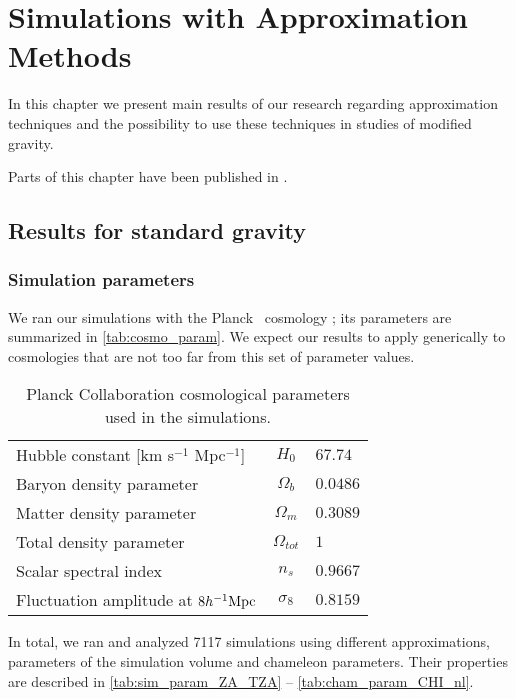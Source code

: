 \chapter{Simulations with Approximation Methods}
\label{chpt:app_sims}
In this chapter we present main results of our research regarding approximation techniques and the possibility to use these techniques in studies of modified gravity.

Parts of this chapter have been published in \textcite{2020MNRAS.493.2085V}.
\section{Results for standard gravity}

\subsection{Simulation parameters}
We ran our simulations with the Planck \LCDM\ cosmology \parencite{planck_cosm}; its parameters are summarized in \autoref{tab:cosmo_param}. We expect our results to apply generically to cosmologies that are not too far from this set of parameter values.
\begin{table}
\begin{tabular}{ l c l }
  \hline \hline
  Hubble constant  [km s$^{-1}$ Mpc$^{-1}$] & $H_0$ & $67.74$ \\
  Baryon density parameter & $\Omega_b$ & $0.0486$ \\
  Matter density parameter & $\Omega_m$ & $0.3089$ \\
  Total density parameter & $\Omega_{tot}$ & $1$ \\
  Scalar spectral index & $n_s$ & $0.9667$ \\
  Fluctuation amplitude at $8h^{-1}\text{Mpc}$ & $\sigma_8$ & $0.8159$ \\
  \hline \hline
\end{tabular}
\caption{Planck Collaboration cosmological parameters \parencite{planck_cosm} used in the simulations.}
\label{tab:cosmo_param}
\end{table}

In total, we ran and analyzed 7117 simulations using different approximations, parameters of the simulation volume and chameleon parameters. Their properties are described in \autoref{tab:sim_param_ZA_TZA} -- \autoref{tab:cham_param_CHI_nl}.

\begin{landscape}


\end{landscape}









